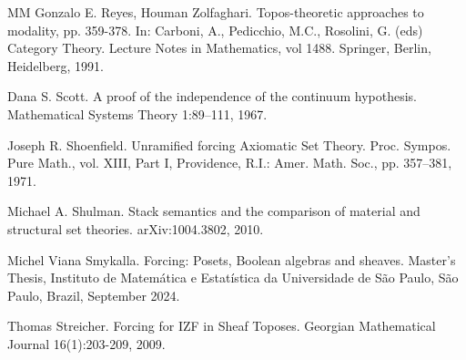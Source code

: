 \documentclass[10pt,longbibliography]{article}
\begin{document}
\begin{thebibliography}{MM}
 Gonzalo E. Reyes, Houman Zolfaghari. Topos-theoretic approaches to modality, pp. 359-378. In: Carboni,
A., Pedicchio, M.C., Rosolini, G. (eds) Category Theory. Lecture Notes in Mathematics, vol
1488. Springer, Berlin, Heidelberg, 1991.



   Dana S. Scott. A proof of the independence of the continuum hypothesis. Mathematical Systems
Theory 1:89–111, 1967.



 Joseph R. Shoenfield. Unramified forcing Axiomatic Set Theory. Proc. Sympos. Pure Math., vol. XIII, Part I, Providence, R.I.: Amer. Math. Soc., pp. 357–381, 1971.

 Michael A. Shulman.
Stack semantics and the comparison of material and structural set theories. arXiv:1004.3802, 2010.

   Michel Viana Smykalla. Forcing: Posets, Boolean algebras and sheaves. Master’s Thesis, Instituto
de Matemática e Estatística da Universidade de São Paulo, São Paulo, Brazil, September 2024.

 Thomas Streicher. Forcing for IZF in Sheaf Toposes. Georgian Mathematical Journal 16(1):203-209, 2009.












\end{thebibliography}
\end{document}
